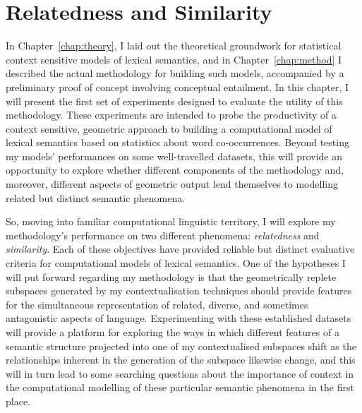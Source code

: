\chapter{Relatedness and Similarity}
In Chapter~\ref{chap:theory}, I laid out the theoretical groundwork for statistical context sensitive models of lexical semantics, and in Chapter~\ref{chap:method} I described the actual methodology for building such models, accompanied by a preliminary proof of concept involving conceptual entailment.  In this chapter, I will present the first set of experiments designed to evaluate the utility of this methodology.  These experiments are intended to probe the productivity of a context sensitive, geometric approach to building a computational model of lexical semantics based on statistics about word co-occurrences.  Beyond testing my models' performances on some well-travelled datasets, this will provide an opportunity to explore whether different components of the methodology and, moreover, different aspects of geometric output lend themselves to modelling related but distinct semantic phenomena.

So, moving into familiar computational linguistic territory, I will explore my methodology's performance on two different phenomena: \emph{relatedness} and \emph{similarity}.  Each of these objectives have provided reliable but distinct evaluative criteria for computational models of lexical semantics.  One of the hypotheses I will put forward regarding my methodology is that the geometrically replete subspaces generated by my contextualisation techniques should provide features for the simultaneous representation of related, diverse, and sometimes antagonistic aspects of language.  Experimenting with these established datasets will provide a platform for exploring the ways in which different features of a semantic structure projected into one of my contextualised subspaces shift as the relationships inherent in the generation of the subspace likewise change, and this will in turn lead to some searching questions about the importance of context in the computational modelling of these particular semantic phenomena in the first place.


